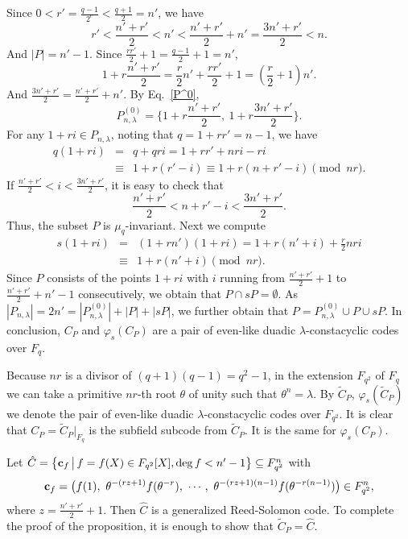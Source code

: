 \documentclass{article}
\numberwithin{equation}{section}
\numberwithin{table}{section}
\def\M{{\varphi}} \def\N{{\psi}} \def\m{{\mu}}
\begin{document}
Since $0<r'=\frac{q-1}{2^e}<\frac{q+1}{2}=n'$,  we have
\begin{equation*}\textstyle
 r'<\frac{n'+r'}{2}<n'<\frac{n'+r'}{2}+n'=\frac{3n'+r'}{2}<n.
\end{equation*}
And $|P|=n'-1$. Since $\frac{rr'}{2}+1=\frac{q-1}{2}+1=n'$,
$$\textstyle
 1+r\frac{n'+r'}{2} =\frac{r}{2}n'+\frac{rr'}{2}+1 =(\frac{r}{2}+1)n'.
$$
And $\frac{3n'+r'}{2}=\frac{n'+r'}{2}+n'$. By Eq.~\eqref{P^0},
$$\textstyle
 P_{n,\lambda}^{(0)}=\{1+r\frac{n'+r'}{2},~1+r\frac{3n'+r'}{2}\}.
$$
For any $1+ri\in P_{n,\lambda}$, noting that $q=1+rr'=n-1$, we have
\begin{eqnarray*}
q(1+ri)&=&q+qri=1+rr'+nri-ri\\
&\equiv& 1+r(r'-i)\equiv 1+r(n+r'-i) \pmod{nr}.
\end{eqnarray*}
If $\frac{n'+r'}{2}<i<\frac{3n'+r'}{2}$, it is easy to check that
$$\textstyle
 \frac{n'+r'}{2}<n+r'-i<\frac{3n'+r'}{2}.
$$
Thus, the subset $P$ is $\mu_q$-invariant. Next we compute
\begin{eqnarray*}
 s(1+ri)&=&\textstyle (1+rn')(1+ri)=1+r(n'+i)+\frac{r}{2}nri\\
 &\equiv&1+r(n'+i)\pmod{nr}.
\end{eqnarray*}
Since $P$ consists of the points $1+ri$ with $i$ running
from $\frac{n'+r'}{2}+1$ to $\frac{n'+r'}{2}+n'-1$ consecutively,
we obtain that $P\cap sP=\emptyset$.
As $|P_{n,\lambda}|=2n'=|P_{n,\lambda}^{(0)}|+|P|+|sP|$,
we further obtain that $P=P_{n,\lambda}^{(0)}\cup P\cup sP$.
In conclusion, $C_P$ and $\M_s(C_P)$ are a pair of even-like duadic
$\lambda$-constacyclic codes over $F_q$.

Because $nr$ is a divisor of $(q+1)(q-1)=q^2-1$,
in the extension $F_{q^2}$ of $F_q$ we can take
a primitive $nr$-th root $\theta$ of unity such that $\theta^n=\lambda$.
By $\widetilde C_P$, $\M_s(\widetilde C_P)$ we denote the pair of
even-like duadic $\lambda$-constacyclic codes over $F_{q^2}$. It is clear that
$C_P=\widetilde C_P|_{F_q}$ is the subfield subcode from $\widetilde C_P$.
It is the same for $\M_s(C_P)$. 

Let 
$\hat C=\big\{{\bf c}_f\,\big|\, f=f(X)\in F_{q^2}[X], \deg f<n'-1\big\}
\subseteq F_{q^2}^n$ with
$$
{\bf c}_f=\big(f(1),~\theta^{-(rz+1)}f(\theta^{-r}),~ \cdots, ~
  \theta^{-(rz+1)(n-1)} f(\theta^{-r(n-1)})\big)\in F_{q^2}^n,
$$
where $z=\frac{n'+r'}{2}+1$. 
Then $\hat C$ is a generalized Reed-Solomon code.
To complete the proof of the proposition,
it is enough to show that $\widetilde C_P=\hat C$.
\end{document}
